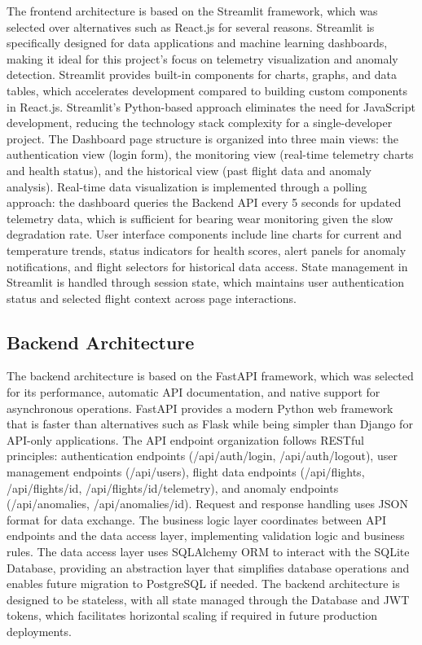 The frontend architecture is based on the Streamlit framework, which was selected over alternatives such as React.js for several reasons. Streamlit is specifically designed for data applications and machine learning dashboards, making it ideal for this project's focus on telemetry visualization and anomaly detection. Streamlit provides built-in components for charts, graphs, and data tables, which accelerates development compared to building custom components in React.js. Streamlit's Python-based approach eliminates the need for JavaScript development, reducing the technology stack complexity for a single-developer project. The Dashboard page structure is organized into three main views: the authentication view (login form), the monitoring view (real-time telemetry charts and health status), and the historical view (past flight data and anomaly analysis). Real-time data visualization is implemented through a polling approach: the dashboard queries the Backend API every 5 seconds for updated telemetry data, which is sufficient for bearing wear monitoring given the slow degradation rate. User interface components include line charts for current and temperature trends, status indicators for health scores, alert panels for anomaly notifications, and flight selectors for historical data access. State management in Streamlit is handled through session state, which maintains user authentication status and selected flight context across page interactions.

\subsection{Backend Architecture}

The backend architecture is based on the FastAPI framework, which was selected for its performance, automatic API documentation, and native support for asynchronous operations. FastAPI provides a modern Python web framework that is faster than alternatives such as Flask while being simpler than Django for API-only applications. The API endpoint organization follows RESTful principles: authentication endpoints (/api/auth/login, /api/auth/logout), user management endpoints (/api/users), flight data endpoints (/api/flights, /api/flights/{id}, /api/flights/{id}/telemetry), and anomaly endpoints (/api/anomalies, /api/anomalies/{id}). Request and response handling uses JSON format for data exchange. The business logic layer coordinates between API endpoints and the data access layer, implementing validation logic and business rules. The data access layer uses SQLAlchemy ORM to interact with the SQLite Database, providing an abstraction layer that simplifies database operations and enables future migration to PostgreSQL if needed. The backend architecture is designed to be stateless, with all state managed through the Database and JWT tokens, which facilitates horizontal scaling if required in future production deployments.

